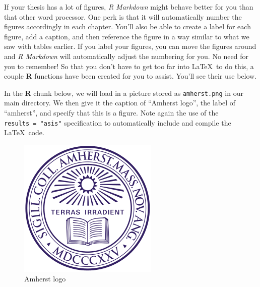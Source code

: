 \documentclass[12pt,twoside]{amherstthesis}
\begin{document}
  If your thesis has a lot of figures, \emph{R Markdown} might behave
  better for you than that other word processor. One perk is that it will
  automatically number the figures accordingly in each chapter. You'll
  also be able to create a label for each figure, add a caption, and then
  reference the figure in a way similar to what we saw with tables
  earlier. If you label your figures, you can move the figures around and
  \emph{R Markdown} will automatically adjust the numbering for you. No
  need for you to remember! So that you don't have to get too far into
  \LaTeX~to do this, a couple \textbf{R} functions have been created for
  you to assist. You'll see their use below.
  
  In the \textbf{R} chunk below, we will load in a picture stored as
  \texttt{amherst.png} in our main directory. We then give it the caption
  of ``Amherst logo'', the label of ``amherst'', and specify that this is
  a figure. Note again the use of the \texttt{results\ =\ "asis"}
  specification to automatically include and compile the \LaTeX~code.
  
  \begin{Shaded}
  \begin{Highlighting}[]
  \NormalTok{(} \NormalTok{, } \NormalTok{, }
         \NormalTok{, } \NormalTok{)}
  \end{Highlighting}
  \end{Shaded}
  
  \begin{figure}[htbp]
  \centering
  \includegraphics[scale = 1,angle = 0]{figure/amherst.png}
  \caption[Amherst logo]{\normalsize{Amherst logo}}
  \label{fig:amherst}
  \end{figure}
  
\end{document}
